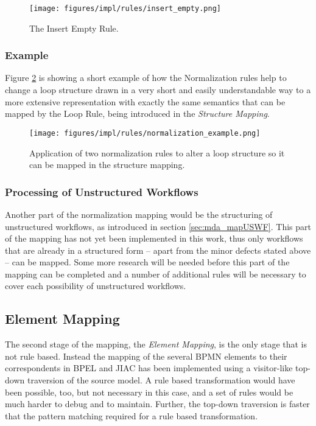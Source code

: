 \begin{figure}[htp]
	\centering
	\texttt{[image: figures/impl/rules/insert\_empty.png]}
	\caption[Insert Empty Rule]{The Insert Empty Rule.}
	\label{fig:insert_empty}
\end{figure}

\subsubsection*{Example}
Figure \ref{fig:normalization_example} is showing a short example of how the Normalization rules help to change a loop structure drawn in a very short and easily understandable way to a more extensive representation with exactly the same semantics that can be mapped by the Loop Rule, being introduced in the \emph{Structure Mapping}.

\begin{figure}[htp]
	\centering
	\texttt{[image: figures/impl/rules/normalization\_example.png]}
	\caption[Normalization example]{Application of two normalization rules to alter a loop structure so it can be mapped in the structure mapping.}
	\label{fig:normalization_example}
\end{figure}

\subsubsection*{Processing of Unstructured Workflows}
Another part of the normalization mapping would be the structuring of unstructured workflows, as introduced in section \ref{sec:mda_mapUSWF}. This part of the mapping has not yet been implemented in this work, thus only workflows that are already in a structured form -- apart from the minor defects stated above -- can be mapped. Some more research will be needed before this part of the mapping can be completed and a number of additional rules will be necessary to cover each possibility of unstructured workflows.


\subsection{Element Mapping}

The second stage of the mapping, the \emph{Element Mapping}, is the only stage that is not rule based. Instead the mapping of the several BPMN elements to their correspondents in BPEL and JIAC has been implemented using a visitor-like top-down traversion of the source model. A rule based transformation would have been possible, too, but not necessary in this case, and a set of rules would be much harder to debug and to maintain. Further, the top-down traversion is faster that the pattern matching required for a rule based transformation.

